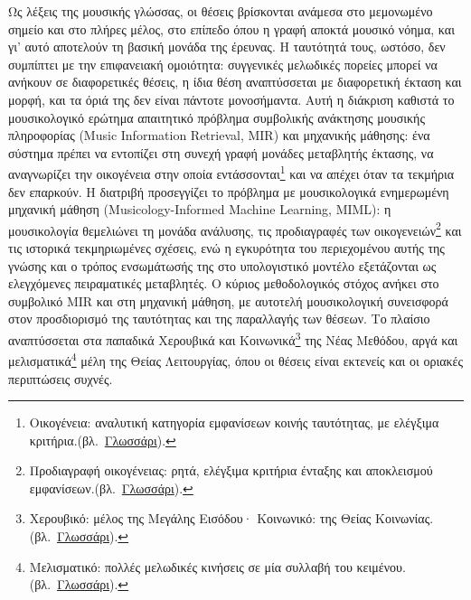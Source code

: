 \documentclass[a4paper]{article}
\newcommand{\musnote}[2]{\footnote{#2\enspace(βλ.~\hyperlink{gl:#1}{Γλωσσάρι}).}}
\begin{document}
Ως λέξεις της μουσικής γλώσσας, οι θέσεις βρίσκονται ανάμεσα στο μεμονωμένο σημείο και στο πλήρες μέλος, στο επίπεδο όπου η γραφή αποκτά μουσικό νόημα, και γι' αυτό αποτελούν τη βασική μονάδα της έρευνας. Η ταυτότητά τους, ωστόσο, δεν συμπίπτει με την επιφανειακή ομοιότητα: συγγενικές μελωδικές πορείες μπορεί να ανήκουν σε διαφορετικές θέσεις, η ίδια θέση αναπτύσσεται με διαφορετική έκταση και μορφή, και τα όριά της δεν είναι πάντοτε μονοσήμαντα. Αυτή η διάκριση καθιστά το μουσικολογικό ερώτημα απαιτητικό πρόβλημα συμβολικής ανάκτησης μουσικής πληροφορίας (Music Information Retrieval, MIR) και μηχανικής μάθησης: ένα σύστημα πρέπει να εντοπίζει στη συνεχή γραφή μονάδες μεταβλητής έκτασης, να αναγνωρίζει την οικογένεια στην οποία εντάσσονται\musnote{family}{Οικογένεια: αναλυτική κατηγορία εμφανίσεων κοινής ταυτότητας, με ελέγξιμα κριτήρια.} και να απέχει όταν τα τεκμήρια δεν επαρκούν. Η διατριβή προσεγγίζει το πρόβλημα με μουσικολογικά ενημερωμένη μηχανική μάθηση (Musicology-Informed Machine Learning, MIML): η μουσικολογία θεμελιώνει τη μονάδα ανάλυσης, τις προδιαγραφές των οικογενειών\musnote{spec}{Προδιαγραφή οικογένειας: ρητά, ελέγξιμα κριτήρια ένταξης και αποκλεισμού εμφανίσεων.} και τις ιστορικά τεκμηριωμένες σχέσεις, ενώ η εγκυρότητα του περιεχομένου αυτής της γνώσης και ο τρόπος ενσωμάτωσής της στο υπολογιστικό μοντέλο εξετάζονται ως ελεγχόμενες πειραματικές μεταβλητές. Ο κύριος μεθοδολογικός στόχος ανήκει στο συμβολικό MIR και στη μηχανική μάθηση, με αυτοτελή μουσικολογική συνεισφορά στον προσδιορισμό της ταυτότητας και της παραλλαγής των θέσεων. Το πλαίσιο αναπτύσσεται στα παπαδικά Χερουβικά και Κοινωνικά\musnote{repertory}{Χερουβικό: μέλος της Μεγάλης Εισόδου· Κοινωνικό: της Θείας Κοινωνίας.} της Νέας Μεθόδου, αργά και μελισματικά\musnote{melismatic}{Μελισματικό: πολλές μελωδικές κινήσεις σε μία συλλαβή του κειμένου.} μέλη της Θείας Λειτουργίας, όπου οι θέσεις είναι εκτενείς και οι οριακές περιπτώσεις συχνές.
\end{document}
